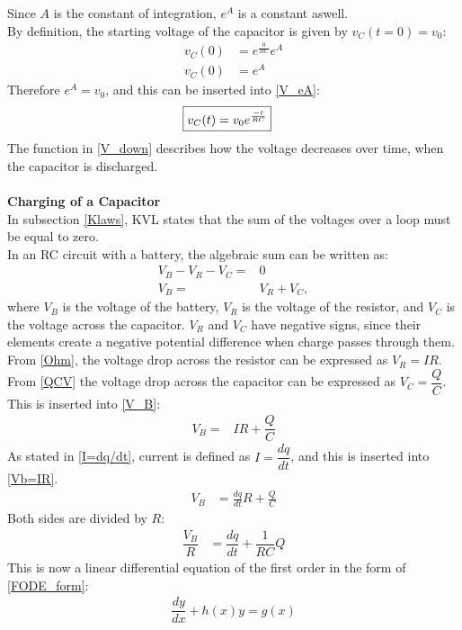 Since $A$ is the constant of integration, $e^A$ is a constant aswell.
\\
By definition, the starting voltage of the capacitor is given by $v_C(t=0)=v_0$:
 \begin{align*}
	v_C(0) &= e^{\frac{0}{RC}}e^A\\
	v_C(0) &= e^A
 \end{align*}
Therefore $e^A = v_0$, and this can be inserted into \eqref{V_eA}:
\begin{align}
\label{V_down}
\Aboxed{
 v_C(t) = v_0e^{\frac{-t}{RC}}
 }
\end{align}
The function in \eqref{V_down} describes how the voltage decreases over time, when the capacitor is discharged.
\\
\\
\textbf{Charging of a Capacitor}\\
In subsection \ref{Klaws}, KVL states that the sum of the voltages over a loop must be equal to zero. 
\\
In an RC circuit with a battery, the algebraic sum can be written as:
\begin{align}
V_B-V_R-V_C =& 0 \nonumber \\
V_B=&V_R+V_C, \label{V_B}
\end{align}
where $V_B$ is the voltage of the battery, $V_R$ is the voltage of the resistor, and $V_C$ is the voltage across the capacitor. $V_R$ and $V_C$ have negative signs, since their elements create a negative potential difference when charge passes through them.
\\
From \eqref{Ohm}, the voltage drop across the resistor can be expressed as $V_R=IR$. From \eqref{QCV} the voltage drop across the capacitor can be expressed as $V_C=\dfrac{Q}{C}$. This is inserted into \eqref{V_B}:
\begin{align}
V_B =& IR+\dfrac{Q}{C} \label{Vb=IR}
\end{align}
As stated in \eqref{I=dq/dt}, current is defined as $I =\dfrac{dq}{dt}$, and this is inserted into \eqref{Vb=IR}.
 \begin{align*}
 	V_B &= \frac{dq}{dt} R + \frac{Q}{C}
 \end{align*}
Both sides are divided by $R$:
\begin{align}
\dfrac{V_B}{R} &= \dfrac{dq}{dt} + \dfrac{1}{RC}Q\label{Vb/R} 
\end{align}
This is now a linear differential equation of the first order in the form of \eqref{FODE_form}:
\begin{align*}
\dfrac{dy}{dx}+h(x)y=g(x)
\end{align*}
